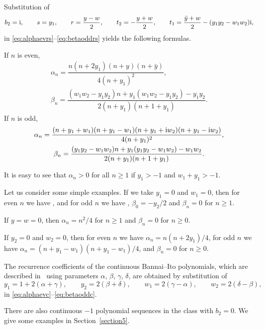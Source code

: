 \documentclass[10pt,a4paper]{amsart}
\numberwithin{equation}{section}
\begin{document}
Substitution of{\samepage
\[ b_2={\rm i},\qquad s=y_1,\qquad r=\dfrac{y-w}{2},\qquad t_2=-\dfrac{y+w}{2},\qquad t_1=\dfrac{\bar y +w}{2} -(y_1 y_2 - w_1 w_2) {\rm i}, \]
 in \eqref{eq:alphaevrs}--\eqref{eq:betaoddrs} yields the following formulas.}

 If $ n$ is even,
 \begin{gather}\label{eq:alphaevc}
\alpha_n=\dfrac{n ( n+2 y_1) ( n + y) ( n+\bar y)}{4 (n+ y_1)^2},
\\ \label{eq:betaevc}
	 \beta_n=\dfrac{( w_1 w_2 -y_1 y_2) n +y_1 ( w_1 w_2 - y_1 y_2) - y_1 y_2}{2 (n + y_1) ( n+1 + y_1)}.
 \end{gather}
If $n$ is odd,
\begin{gather}\label{eq:alphaoddc}
	\alpha_n=\dfrac{ (n+y_1+w_1) (n+y_1 - w_1) (n+ y_1 + {\rm i} w_2) ( n+ y_1 - {\rm i} w_2)}{4 ( n+y_1)^2},
\\ \label{eq:betaoddc}
	 \beta_n=\dfrac{(y_1 y_2 - w_1 w_2) n + y_1( y_1 y_2 - w_1 w_2) -w_1 w_2}{2 ( n+y_1) ( n+1 + y_1)}.
\end{gather}

It is easy to see that $\alpha_n >0$ for all $n \ge 1$ if $ y_1>-1$ and $ w_1 + y_1 > -1$.

Let us consider some simple examples. If we take $y_1=0$ and $w_1=0$, then for even $n$ we have , and for odd $n$ we have , $\beta_0=-y_2/2$ and $\beta_n=0$ for $n\ge 1$.

If $y=w=0$, then $ \alpha_n=n^2/4$ for $n\ge 1$ and $\beta_n=0$ for $n\ge 0$.

If $y_2=0$ and $w_2=0$, then for even $n$ we have $\alpha_n=n ( n+ 2 y_1)/4$, for odd $n$ we have $\alpha_n=(n+y_1 - w_1) (n+ y_1 - w_1)/4$, and $\beta_n=0$ for $n\ge 0$.

The recurrence coefficients of the continuous Bannai--Ito polynomials, which are described in~\cite{PellVZ} using parameters $\alpha$, $\beta$, $\gamma$, $\delta$, are obtained by substitution of
\[ y_1=1+ 2 ( \alpha + \gamma),\qquad y_2=2 ( \beta + \delta),\qquad w_1=2 ( \gamma - \alpha), \qquad w_2=2 ( \delta - \beta), \]
 in \eqref{eq:alphaevc}--\eqref{eq:betaoddc}.

 There are also continuous $-1$ polynomial sequences in the class with $b_2=0$.
 We give some examples in Section~\ref{section5}.
\end{document}
